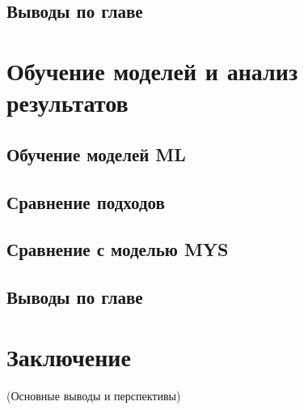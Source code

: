 \documentclass[a4paper,12pt]{article}
\begin{document}
  \subsection{Выводы по главе}
\newpage

\section{Обучение моделей и анализ результатов}
  \subsection{Обучение моделей ML}
  \subsection{Сравнение подходов}
  \subsection{Сравнение с моделью MYS}
  \subsection{Выводы по главе}
\newpage

\section*{Заключение}
(Основные выводы и перспективы)
\newpage



\printbibliography

\end{document}
